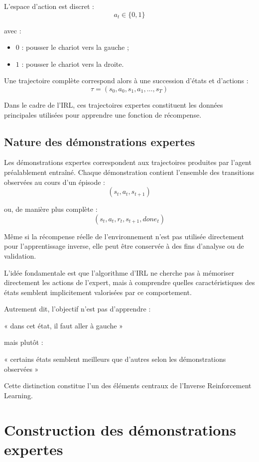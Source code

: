 L’espace d’action est discret :
\[
a_t \in \{0,1\}
\]

avec :
\begin{itemize}
    \item \(0\) : pousser le chariot vers la gauche ;
    \item \(1\) : pousser le chariot vers la droite.
\end{itemize}

Une trajectoire complète correspond alors à une succession d’états et d’actions :
\[
\tau = (s_0,a_0,s_1,a_1,\dots,s_T)
\]

Dans le cadre de l’IRL, ces trajectoires expertes constituent les données principales utilisées pour apprendre une fonction de récompense.

\subsection{Nature des démonstrations expertes}

Les démonstrations expertes correspondent aux trajectoires produites par l’agent préalablement entraîné. Chaque démonstration contient l’ensemble des transitions observées au cours d’un épisode :
\[
(s_t,a_t,s_{t+1})
\]

ou, de manière plus complète :
\[
(s_t,a_t,r_t,s_{t+1},done_t)
\]

Même si la récompense réelle de l’environnement n’est pas utilisée directement pour l’apprentissage inverse, elle peut être conservée à des fins d’analyse ou de validation.

L’idée fondamentale est que l’algorithme d’IRL ne cherche pas à mémoriser directement les actions de l’expert, mais à comprendre quelles caractéristiques des états semblent implicitement valorisées par ce comportement.

Autrement dit, l’objectif n’est pas d’apprendre :
\begin{center}
« dans cet état, il faut aller à gauche »
\end{center}

mais plutôt :
\begin{center}
« certains états semblent meilleurs que d’autres selon les démonstrations observées »
\end{center}

Cette distinction constitue l’un des éléments centraux de l’Inverse Reinforcement Learning.

\section{Construction des démonstrations expertes}


